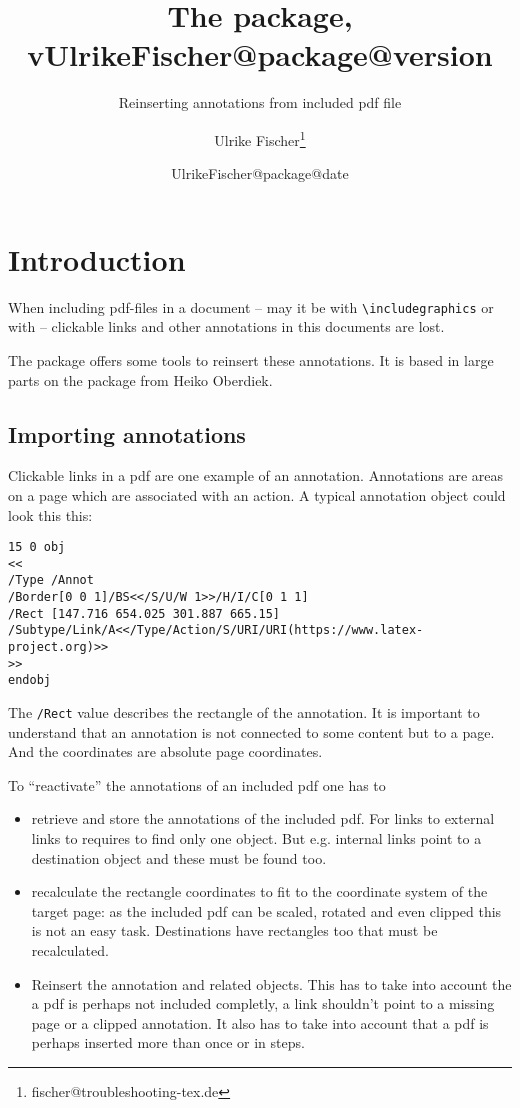 \documentclass[DIV=12,parskip=half-,bibliography=totoc]{scrartcl}
\title{The \pkg{newpax} package, v\csname UlrikeFischer@package@version\endcsname}
\subtitle{Reinserting annotations from included pdf file}
\date{\csname UlrikeFischer@package@date\endcsname}
\author{Ulrike Fischer\thanks{fischer@troubleshooting-tex.de}}
\begin{document}
\maketitle

\section{Introduction}

When including pdf-files in a document -- may it be with \verb+\includegraphics+ or with \verb++ -- clickable links and other annotations in this documents are lost.

The   package offers some tools to reinsert these annotations. It is based in large parts
on the  package from Heiko Oberdiek. 

\subsection{Importing annotations}

Clickable links in a pdf are one example of an annotation. Annotations are areas on a page which are associated with an action. A typical annotation object could look this this:

\begin{lstlisting}
15 0 obj
<<
/Type /Annot
/Border[0 0 1]/BS<</S/U/W 1>>/H/I/C[0 1 1]
/Rect [147.716 654.025 301.887 665.15]
/Subtype/Link/A<</Type/Action/S/URI/URI(https://www.latex-project.org)>>
>>
endobj
\end{lstlisting} 

The \texttt{/Rect} value describes the rectangle of the annotation. It is important to understand that an annotation is not connected to some content but to a page. And the coordinates are absolute page coordinates. 

 
To \enquote{reactivate} the annotations of an included pdf one has to
\begin{itemize}
\item retrieve and store the annotations of the included pdf. For links to external links to requires to find only one object. But e.g. internal links point to a destination object and these must be found too.
\item recalculate the rectangle coordinates to fit to the coordinate system of the target page: as the included pdf can be scaled, rotated and even clipped this is not an easy task. Destinations have rectangles too that must be recalculated.
\item  Reinsert the annotation and related objects. This has to take into account the a pdf is perhaps not included completly, a link shouldn't point to a missing page or a clipped annotation. It also has to take into account that a pdf is perhaps inserted more than once or in steps. 
\end{itemize}
\end{document}
